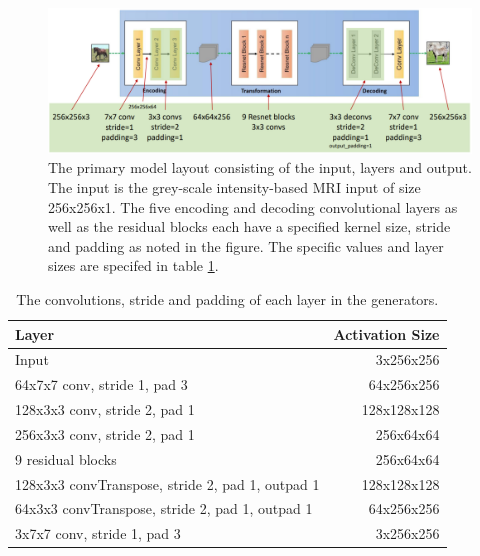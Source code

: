 \documentclass[12pt, fleqn, titlepage]{article}
\begin{document}
\begin{figure}[H]
	\centering
	\includegraphics[width=0.7\linewidth]{imgs/cyclegan_generator_layers}
	\caption{The primary model layout consisting of the input, layers and output. The input is the grey-scale intensity-based MRI input of size 256x256x1. The five encoding and decoding convolutional layers as well as the residual blocks each have a specified kernel size, stride and padding as noted in the figure. The specific values and layer sizes are specifed in table \ref{generator_layers}.} %
	\label{fig:cyclegangeneratorlayers}
\end{figure}


\begin{table}[H]\label{generator_layers}
	\centering
	\begin{tabular}{lr}\toprule
		Layer                                            & Activation Size \\ \midrule
		Input                                            & 3x256x256       \\
		64x7x7 conv, stride 1, pad 3                     & 64x256x256      \\
		128x3x3 conv, stride 2, pad 1                    & 128x128x128     \\
		256x3x3 conv, stride 2, pad 1                    & 256x64x64       \\
		9 residual blocks                                & 256x64x64       \\
		128x3x3 convTranspose, stride 2, pad 1, outpad 1 & 128x128x128     \\
		64x3x3 convTranspose, stride 2, pad 1, outpad 1  & 64x256x256      \\
		3x7x7 conv, stride 1, pad 3                      & 3x256x256       \\ \bottomrule
	\end{tabular}
	\caption{The convolutions, stride and padding of each layer in the generators.}
\end{table}
\end{document}
